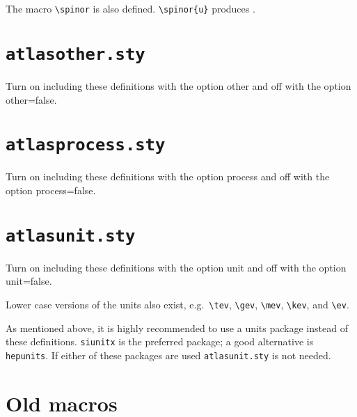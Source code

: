 \documentclass[UKenglish,texlive=2013]{latex/atlasdoc}
\newcommand{\File}[1]{\texttt{#1}\xspace}
\newcommand{\Macro}[1]{\texttt{\textbackslash #1}\xspace}
\newcommand{\Option}[1]{\textsf{#1}\xspace}
\newcommand{\Package}[1]{\texttt{#1}\xspace}
\begin{document}
{

\noindent The macro \Macro{spinor} is also defined.
\verb|\spinor{u}| produces .


\newpage
\section{\File{atlasother.sty}}

Turn on including these definitions with the option \Option{other} and off with the option \Option{other=false}.




\newpage
\section{\File{atlasprocess.sty}}

Turn on including these definitions with the option \Option{process} and off with the option \Option{process=false}.




\newpage
\section{\File{atlasunit.sty}}

Turn on including these definitions with the option \Option{unit} and off with the option \Option{unit=false}.



\noindent Lower case versions of the units also exist, e.g.\ \verb|\tev|, \verb|\gev|, \verb|\mev|, \verb|\kev|, and
\verb|\ev|. 

As mentioned above, it is highly recommended to use a units package instead of
these definitions. \Package{siunitx} is the preferred package; a good alternative is \Package{hepunits}.
If either of these packages are used \File{atlasunit.sty} is not needed.


\onecolumn
\section{Old macros}
\label{sec:old}

}
\end{document}
